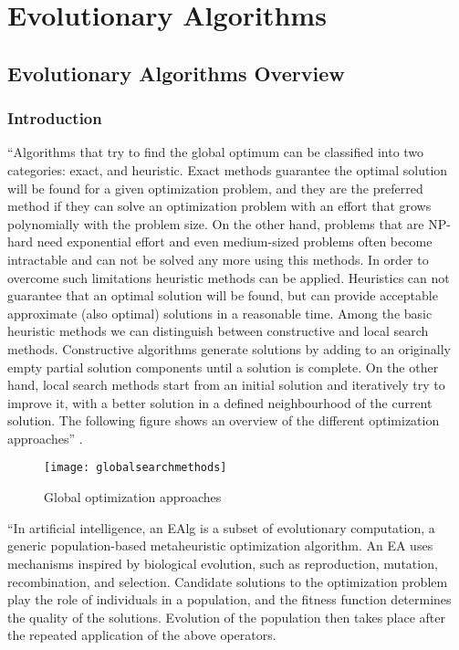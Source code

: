 

\part{Evolutionary Algorithms}

\chapter{Evolutionary Algorithms Overview}
\label{chap:EvolAlgoOverview}


\section{Introduction}


``Algorithms that try to find the global optimum can be classified into two categories:
exact, and heuristic. Exact methods guarantee the optimal solution will be found for a given optimization problem, and they are the preferred method if they can solve an optimization problem with an effort that grows polynomially with the problem size. On the other hand, problems that are NP-hard  need exponential effort and even medium-sized problems often become intractable and can not be solved any more using this methods. In order to overcome such limitations heuristic methods can be applied. Heuristics can not guarantee that an optimal solution will be found, but can provide acceptable approximate (also optimal) solutions in a reasonable time. Among the basic heuristic methods we can distinguish between constructive and local search methods. Constructive algorithms generate solutions by adding to an originally empty partial solution components until a solution is complete. On the other hand, local search methods start from an initial solution and iteratively
try to improve it, with a better solution in a defined neighbourhood of the current solution. The following  figure shows an overview of the different optimization approaches''
\cite{Lindquist2017}.


\begin{figure*}[tph]
\texttt{[image: globalsearchmethods]}
\caption{Global optimization approaches}
\label{fig:globalsearchmethods}
\end{figure*}


``In artificial intelligence, an \ac{EAlg} is a subset of evolutionary computation, a generic population-based metaheuristic optimization algorithm. An EA uses mechanisms inspired by biological evolution, such as reproduction, mutation, recombination, and selection. Candidate solutions to the optimization problem play the role of individuals in a population, and the fitness function determines the quality of the solutions. Evolution of the population then takes place after the repeated application of the above operators.

